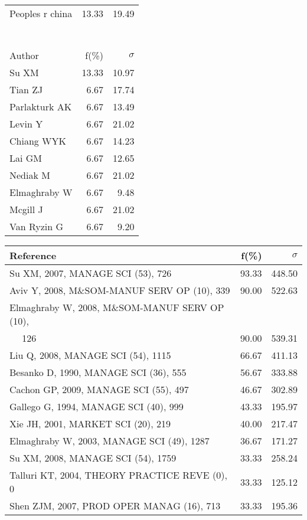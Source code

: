 \documentclass[a4paper,11pt]{report}
\begin{document}
\begin{landscape}
\begin{table}[!ht]
{\begin{tabular}{|l r r|}
Peoples r china & 13.33 & 19.49\\
 &  & \\
 &  & \\
 &  & \\
 &  & \\
 &  & \\
 &  & \\
 &  & \\
\hline
\hline
Author & f(\%) & $\sigma$\\
\hline
Su XM & 13.33 & 10.97\\
Tian ZJ & 6.67 & 17.74\\
Parlakturk AK & 6.67 & 13.49\\
Levin Y & 6.67 & 21.02\\
Chiang WYK & 6.67 & 14.23\\
Lai GM & 6.67 & 12.65\\
Nediak M & 6.67 & 21.02\\
Elmaghraby W & 6.67 & 9.48\\
Mcgill J & 6.67 & 21.02\\
Van Ryzin G & 6.67 & 9.20\\
\hline
\end{tabular}
}
{\scriptsize\begin{tabular}{|l r r|}
\hline
Reference & f(\%) & $\sigma$\\
\hline
Su XM, 2007, MANAGE SCI (53), 726 & 93.33 & 448.50\\
Aviv Y, 2008, M\&SOM-MANUF SERV OP (10), 339 & 90.00 & 522.63\\
Elmaghraby W, 2008, M\&SOM-MANUF SERV OP (10), &  & \\
$\quad$ 126 & 90.00 & 539.31\\
Liu Q, 2008, MANAGE SCI (54), 1115 & 66.67 & 411.13\\
Besanko D, 1990, MANAGE SCI (36), 555 & 56.67 & 333.88\\
Cachon GP, 2009, MANAGE SCI (55), 497 & 46.67 & 302.89\\
Gallego G, 1994, MANAGE SCI (40), 999 & 43.33 & 195.97\\
Xie JH, 2001, MARKET SCI (20), 219 & 40.00 & 217.47\\
Elmaghraby W, 2003, MANAGE SCI (49), 1287 & 36.67 & 171.27\\
Su XM, 2008, MANAGE SCI (54), 1759 & 33.33 & 258.24\\
Talluri KT, 2004, THEORY PRACTICE REVE (0), 0 & 33.33 & 125.12\\
Shen ZJM, 2007, PROD OPER MANAG (16), 713 & 33.33 & 195.36\\

\end{tabular}}
\end{table}
\end{landscape}
\end{document}
